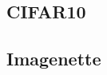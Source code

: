 \subsection{CIFAR10}
\label{subsec:cifat10}

\subsection{Imagenette}
\label{subsec:imagenette}







